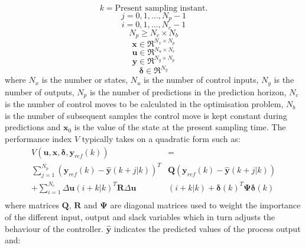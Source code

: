 \documentclass[preprint,authoryear,12pt]{elsarticle}
\begin{document}
\begin{displaymath}
k = \textrm{Present sampling instant.} 
\end{displaymath}
\begin{displaymath}
j = 0,1,..., N_p-1 
\end{displaymath}
\begin{displaymath}
i = 0,1,..., N_c-1
\end{displaymath}
\begin{displaymath}
N_p \ge N_c \times N_b
\end{displaymath}
\begin{displaymath}
\mathbf{x}\in \Re^{N_x \times N_p}
\end{displaymath}
\begin{displaymath}
\mathbf{u}\in \Re^{N_u \times N_c}
\end{displaymath}
\begin{displaymath}
\mathbf{y}\in \Re^{N_y \times N_p}
\end{displaymath}
\begin{displaymath}
\boldsymbol{\delta}\in \Re^{N_y}
\end{displaymath}
where $N_x$ is the number or states, $N_u$ is the number of control inputs, $N_y$ is the number of outputs, $N_p$ is the number of predictions in the prediction horizon, $N_c$ is the number of control moves to be calculated in the optimisation problem, $N_b$ is the number of subsequent samples the control move is kept constant during predictions and $\mathbf{x}_0$ is the value of the state at the present sampling time. The performance index $V$ typically takes on a quadratic form such as:
\begin{equation}
\label{eq:MPC problem}
\begin{split}
V(\mathbf{u},\mathbf{x},\boldsymbol{\delta},\mathbf{y}_{ref}(k))&=\\
\sum_{j=1}^{N_p}(\mathbf{y}_{ref}(k)-\hat{\mathbf{y}}(k+j|k))^{T}&\mathbf{Q}(\mathbf{y}_{ref}(k)-\hat{\mathbf{y}}(k+j|k))\\+\sum_{i=1}^{N_c}\Delta \mathbf{u}(i+k|k)^{T}\mathbf{R}\Delta \mathbf{u}&(i+k|k)
+\boldsymbol{\delta}(k)^T \boldsymbol{\Psi} \boldsymbol{\delta}(k)\\
\end{split}
\end{equation}
where matrices $\mathbf{Q}$, $\mathbf{R}$ and $\boldsymbol{\Psi}$ are diagonal matrices used to weight the importance of the different input, output and slack variables which in turn adjusts the behaviour of the controller. $\hat{\mathbf{y}}$ indicates the predicted values of the process output and: 
\end{document}
